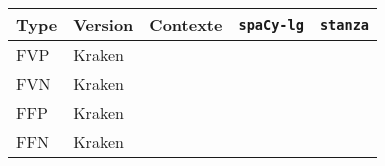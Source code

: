 \scriptsize{
\begin{tabular}{|l|l|l|l|l|}
\hline
Type &Version & Contexte & \texttt{spaCy-lg} &\texttt{stanza}\\
\hline
FVP&Kraken && \textcolor{red}{}  & \\
FVN&Kraken && \textcolor{red}{}  & \\
\hline
FFP&Kraken && \textcolor{red}{}  & \\
FFN&Kraken && \textcolor{red}{}  & \\
\hline
\end{tabular}}
